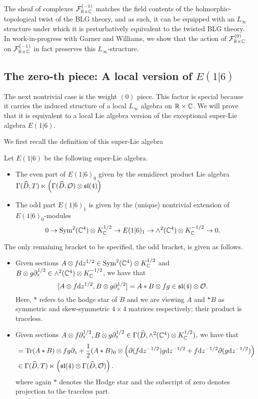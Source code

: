 The sheaf of complexes $\mathcal{F}^{(-1)}_{\mathbb{R}\times \mathbb{C}}$ matches the field contents of the holmorphic-topological twist of the BLG theory, and as such, it can be equipped with an $L_\infty$ structure under which it is perturbatively equivalent to the twisted BLG theory. In work-in-progress with Garner and Williams, we show that the action of $\mathcal{F}^{(0)}_{\mathbb{R}\times \mathbb{C}}$ on $\mathcal{F}^{(-1)}_{\mathbb{R}\times \mathbb{C}}$ in fact preserves this $L_\infty$-structure. 

\subsection{The zero-th piece: A local version of $E(1|6)$}
\parsec[] The next nontrivial case is the weight ${(0)}$ piece. This factor is special because it carries the induced structure of a local $L_\infty$ algebra on $\mathbb{R}\times \mathbb{C}$. We will prove that it is equivalent to a local Lie algebra version of the exceptional super-Lie algebra $E(1|6)$. 

We first recall the definition of this super-Lie algebra \cite{KacBible}
\begin{defn}\label{defn:e(1|6)}
Let $E(1|6)$ be the following super-Lie algebra. 
\begin{itemize}
\item The even part of $E(1|6)_0$ given by the semidirect product Lie algebra $\Gamma (\widehat D, T) \ltimes \left( \Gamma (\widehat D, \mathcal{O}) \otimes \mathfrak{sl}(4) \right )$
\item The odd part $E(1|6)_1$ is given by the (unique) nontrivial extension of $E(1|6)_0$-modules 
\[0\to \text{Sym}^2 (\mathbb{C}^4)\otimes K^{1/2}_{\mathbb{C}} \to E(1|6)_1 \to \wedge^2 (\mathbb{C}^4) \otimes K^{-1/2}_{\mathbb{C}} \to 0.\]

\end{itemize}
The only remaining bracket to be specified, the odd bracket, is given as follows.
\begin{itemize}
\item Given sections $A \otimes f \mathrm{d} z^{1/2}\in \text{Sym}^2 (\mathbb{C}^4)\otimes K^{1/2}_{\mathbb{C}}$ and $B\otimes g \partial_z^{1/2}\in \wedge^2 (\mathbb{C}^4)\otimes K^{-1/2}_{\mathbb{C}}$, we have that
\[
[A \otimes f \mathrm{d} z^{1/2}, B\otimes g \partial_z^{1/2}] = A*B \otimes fg \in \mathfrak{sl}(4)\otimes \mathcal{O}.
\]
Here, $*$ refers to the hodge star of $B$ and we are viewing $A$ and $*B$ as symmetric and skew-symmetric $4\times 4$ matrices respectively; their product is traceless. 

\item Given sections $A \otimes f \partial_z^{1/2}, B\otimes g \partial_z^{1/2} \in \Gamma( \widehat D, \wedge^2 (\mathbb{C}^4) \otimes K^{1/2}_{\mathbb{C}})$, we have that 
\begin{align*}
[A\otimes f \d z^{-1/2} , B \otimes g \d z^{-1/2} ] & = \tr (A * B) \otimes fg \del_z + \frac12 (A*B)_0 \otimes \left (\del (f \d z^{-1/2} ) g \d z^{-1/2} + f \d z^{-1/2} \del (g \d z^{-1/2} ) \right ) \\
& \in \Gamma (\hat D, T) \ltimes \left (\mf {sl}(4) \otimes \Gamma (\hat D, \mc O) \right ) .
\end{align*}
where again $*$ denotes the Hodge star and the subscript of zero denotes projection to the traceless part. 
\end{itemize}
\end{defn}

